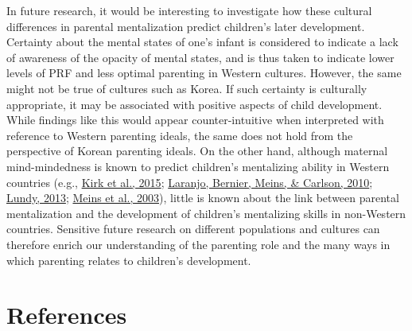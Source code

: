 \documentclass[
]{article}
\begin{document}
In future research, it would be interesting to investigate how these cultural differences in parental mentalization predict children's later development. Certainty about the mental states of one's infant is considered to indicate a lack of awareness of the opacity of mental states, and is thus taken to indicate lower levels of PRF and less optimal parenting in Western cultures. However, the same might not be true of cultures such as Korea. If such certainty is culturally appropriate, it may be associated with positive aspects of child development. While findings like this would appear counter-intuitive when interpreted with reference to Western parenting ideals, the same does not hold from the perspective of Korean parenting ideals. On the other hand, although maternal mind-mindedness is known to predict children's mentalizing ability in Western countries (e.g., \protect\hyperlink{ref-Kirk2015}{Kirk et al., 2015}; \protect\hyperlink{ref-Laranjo2010}{Laranjo, Bernier, Meins, \& Carlson, 2010}; \protect\hyperlink{ref-Lundy2013}{Lundy, 2013}; \protect\hyperlink{ref-Meins2003}{Meins et al., 2003}), little is known about the link between parental mentalization and the development of children's mentalizing skills in non-Western countries. Sensitive future research on different populations and cultures can therefore enrich our understanding of the parenting role and the many ways in which parenting relates to children's development.

\hypertarget{references}{%
\section*{References}\label{references}}
\end{document}
